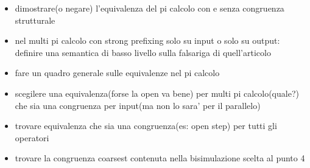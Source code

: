 




\begin{itemize}
  \item
    dimostrare(o negare) l'equivalenza del pi calcolo con e senza congruenza strutturale
  \item
    nel multi pi calcolo con strong prefixing solo su input o solo su output: definire una semantica di basso livello sulla falsariga di quell'articolo
  \item
    fare un quadro generale sulle equivalenze nel pi calcolo
  \item
    scegilere una equivalenza(forse la open va bene) per multi pi calcolo(quale?) che sia una congruenza per input(ma non lo sara' per il parallelo)
  \item
    trovare equivalenza che sia una congruenza(es: open step) per tutti gli operatori
  \item
    trovare la congruenza coarsest contenuta nella bisimulazione scelta al punto 4
\end{itemize}


% 
% 
% 
% 
% 
% 
% 
% 
% 
% 
% 
% 
% 
% 
% 
% 
% 
% 
% 


